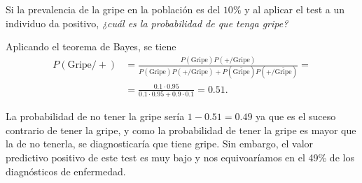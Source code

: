 \begin{frame}
{Si la prevalencia de la gripe en la población es del $10\%$ y al aplicar el test a un individuo da positivo, \emph{¿cuál es la probabilidad
de que tenga gripe?}

Aplicando el teorema de Bayes, se tiene
\begin{align*}
P(\mbox{Gripe}/+) &= \frac{P(\mbox{Gripe})P(+/\mbox{Gripe})}{P(\mbox{Gripe})P(+/\mbox{Gripe})+P(\overline{\mbox{Gripe}})P(+/\overline{\mbox{Gripe}})} =\\
&= \frac{0.1\cdot 0.95}{0.1\cdot 0.95+0.9\cdot 0.1} = 0.51.
\end{align*}

La probabilidad de no tener la gripe sería $1-0.51=0.49$ ya que es el suceso contrario de tener la gripe, y como la probabilidad de tener la
gripe es mayor que la de no tenerla, se diagnosticaría que tiene gripe. Sin embargo, el valor predictivo positivo de este test es muy bajo y
nos equivoaríamos en el 49\% de los diagnósticos de enfermedad.
}
\end{frame}


